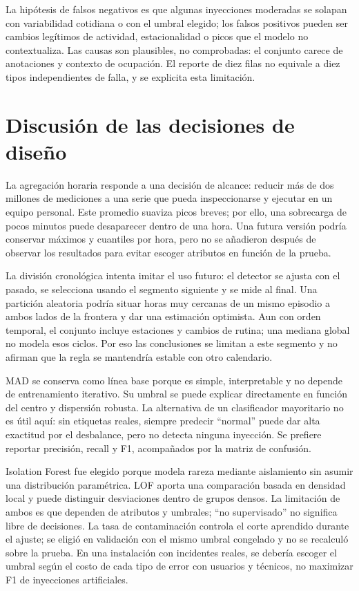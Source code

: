 \documentclass[10pt,twocolumn]{article}
\begin{document}
La hipótesis de falsos negativos es que algunas inyecciones moderadas se solapan con variabilidad cotidiana o con el umbral elegido; los falsos positivos pueden ser cambios legítimos de actividad, estacionalidad o picos que el modelo no contextualiza. Las causas son plausibles, no comprobadas: el conjunto carece de anotaciones y contexto de ocupación. El reporte de diez filas no equivale a diez tipos independientes de falla, y se explicita esta limitación.

\section{Discusión de las decisiones de diseño}
La agregación horaria responde a una decisión de alcance: reducir más de dos millones de mediciones a una serie que pueda inspeccionarse y ejecutar en un equipo personal. Este promedio suaviza picos breves; por ello, una sobrecarga de pocos minutos puede desaparecer dentro de una hora. Una futura versión podría conservar máximos y cuantiles por hora, pero no se añadieron después de observar los resultados para evitar escoger atributos en función de la prueba.

La división cronológica intenta imitar el uso futuro: el detector se ajusta con el pasado, se selecciona usando el segmento siguiente y se mide al final. Una partición aleatoria podría situar horas muy cercanas de un mismo episodio a ambos lados de la frontera y dar una estimación optimista. Aun con orden temporal, el conjunto incluye estaciones y cambios de rutina; una mediana global no modela esos ciclos. Por eso las conclusiones se limitan a este segmento y no afirman que la regla se mantendría estable con otro calendario.

MAD se conserva como línea base porque es simple, interpretable y no depende de entrenamiento iterativo. Su umbral se puede explicar directamente en función del centro y dispersión robusta. La alternativa de un clasificador mayoritario no es útil aquí: sin etiquetas reales, siempre predecir “normal” puede dar alta exactitud por el desbalance, pero no detecta ninguna inyección. Se prefiere reportar precisión, recall y F1, acompañados por la matriz de confusión.

Isolation Forest fue elegido porque modela rareza mediante aislamiento sin asumir una distribución paramétrica. LOF aporta una comparación basada en densidad local y puede distinguir desviaciones dentro de grupos densos. La limitación de ambos es que dependen de atributos y umbrales; “no supervisado” no significa libre de decisiones. La tasa de contaminación controla el corte aprendido durante el ajuste; se eligió en validación con el mismo umbral congelado y no se recalculó sobre la prueba. En una instalación con incidentes reales, se debería escoger el umbral según el costo de cada tipo de error con usuarios y técnicos, no maximizar F1 de inyecciones artificiales.
\end{document}
